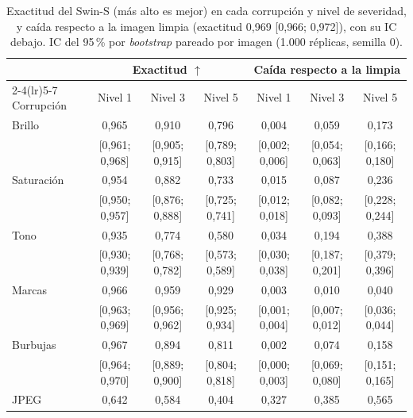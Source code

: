 \begin{table}
\centering
\scriptsize
\setlength{\tabcolsep}{3pt}
\caption{Exactitud del Swin-S (más alto es mejor) en cada corrupción y nivel de severidad, y caída respecto a la imagen limpia (exactitud 0{,}969 [0{,}966; 0{,}972]), con su IC debajo. IC del 95\,\% por \emph{bootstrap} pareado por imagen (1.000 réplicas, semilla 0).}
\label{tab:ood-corr-exactitud}
\begin{tabular*}{\linewidth}{@{\extracolsep{\fill}}lcccccc}
\toprule
& \multicolumn{3}{c}{Exactitud $\uparrow$} & \multicolumn{3}{c}{Caída respecto a la limpia} \\
\cmidrule(lr){2-4}\cmidrule(lr){5-7}
Corrupción & Nivel 1 & Nivel 3 & Nivel 5 & Nivel 1 & Nivel 3 & Nivel 5 \\
\midrule
Brillo & 0{,}965 & 0{,}910 & 0{,}796 & 0{,}004 & 0{,}059 & 0{,}173 \\
& {\tiny [0{,}961; 0{,}968]} & {\tiny [0{,}905; 0{,}915]} & {\tiny [0{,}789; 0{,}803]} & {\tiny [0{,}002; 0{,}006]} & {\tiny [0{,}054; 0{,}063]} & {\tiny [0{,}166; 0{,}180]} \\[2pt]
Saturación & 0{,}954 & 0{,}882 & 0{,}733 & 0{,}015 & 0{,}087 & 0{,}236 \\
& {\tiny [0{,}950; 0{,}957]} & {\tiny [0{,}876; 0{,}888]} & {\tiny [0{,}725; 0{,}741]} & {\tiny [0{,}012; 0{,}018]} & {\tiny [0{,}082; 0{,}093]} & {\tiny [0{,}228; 0{,}244]} \\[2pt]
Tono & 0{,}935 & 0{,}774 & 0{,}580 & 0{,}034 & 0{,}194 & 0{,}388 \\
& {\tiny [0{,}930; 0{,}939]} & {\tiny [0{,}768; 0{,}782]} & {\tiny [0{,}573; 0{,}589]} & {\tiny [0{,}030; 0{,}038]} & {\tiny [0{,}187; 0{,}201]} & {\tiny [0{,}379; 0{,}396]} \\[2pt]
Marcas & 0{,}966 & 0{,}959 & 0{,}929 & 0{,}003 & 0{,}010 & 0{,}040 \\
& {\tiny [0{,}963; 0{,}969]} & {\tiny [0{,}956; 0{,}962]} & {\tiny [0{,}925; 0{,}934]} & {\tiny [0{,}001; 0{,}004]} & {\tiny [0{,}007; 0{,}012]} & {\tiny [0{,}036; 0{,}044]} \\[2pt]
Burbujas & 0{,}967 & 0{,}894 & 0{,}811 & 0{,}002 & 0{,}074 & 0{,}158 \\
& {\tiny [0{,}964; 0{,}970]} & {\tiny [0{,}889; 0{,}900]} & {\tiny [0{,}804; 0{,}818]} & {\tiny [0{,}000; 0{,}003]} & {\tiny [0{,}069; 0{,}080]} & {\tiny [0{,}151; 0{,}165]} \\[2pt]
JPEG & 0{,}642 & 0{,}584 & 0{,}404 & 0{,}327 & 0{,}385 & 0{,}565 \\

\end{tabular*}
\end{table}
